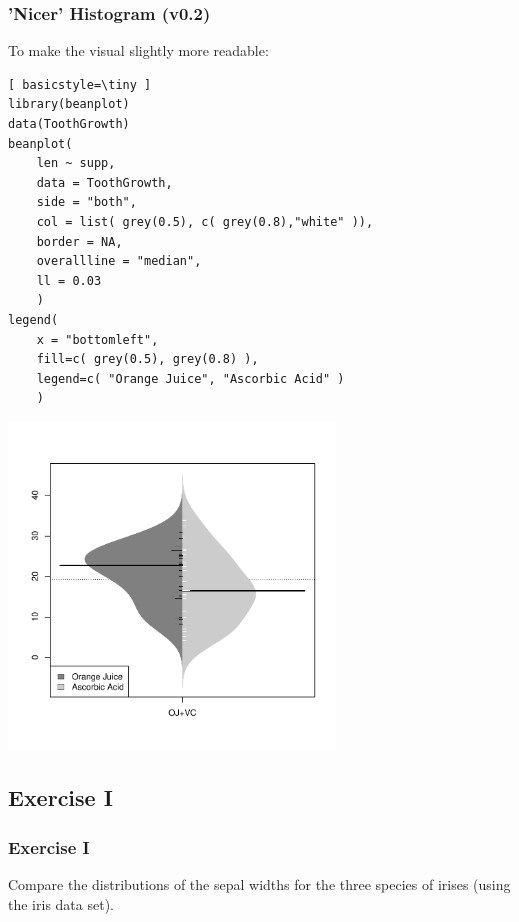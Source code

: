 \begin{frame}
\frametitle{'Nicer' Histogram (v0.2)}
To make the visual slightly more readable:

	\begin{lstlisting}[ basicstyle=\tiny ]
library(beanplot)
data(ToothGrowth)
beanplot(
	len ~ supp, 
	data = ToothGrowth, 
	side = "both", 
	col = list( grey(0.5), c( grey(0.8),"white" )), 
	border = NA, 
	overallline = "median", 
	ll = 0.03
	)
legend(
	x = "bottomleft",
	fill=c( grey(0.5), grey(0.8) ), 
	legend=c( "Orange Juice", "Ascorbic Acid" )
	)
	\end{lstlisting}
	
        \begin{center}
	         \includegraphics[width=0.65\textwidth]{images/beanplot.pdf}
        \end{center}
\end{frame}

%





\subsection{Exercise I}
\begin{frame}
	\frametitle{Exercise I}
	Compare the distributions of the sepal widths for the three species of irises (using the \ttfamily iris \normalfont data set).
\end{frame}